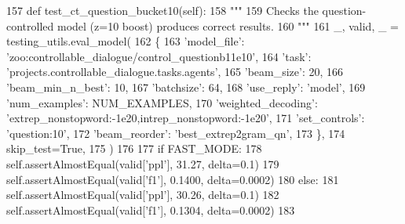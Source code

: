\begin{DoxyCode}
157     \textcolor{keyword}{def }test\_ct\_question\_bucket10(self):
158         \textcolor{stringliteral}{"""}
159 \textcolor{stringliteral}{        Checks the question-controlled model (z=10 boost) produces correct results.}
160 \textcolor{stringliteral}{        """}
161         \_, valid, \_ = testing\_utils.eval\_model(
162             \{
163                 \textcolor{stringliteral}{'model\_file'}: \textcolor{stringliteral}{'zoo:controllable\_dialogue/control\_questionb11e10'},
164                 \textcolor{stringliteral}{'task'}: \textcolor{stringliteral}{'projects.controllable\_dialogue.tasks.agents'},
165                 \textcolor{stringliteral}{'beam\_size'}: 20,
166                 \textcolor{stringliteral}{'beam\_min\_n\_best'}: 10,
167                 \textcolor{stringliteral}{'batchsize'}: 64,
168                 \textcolor{stringliteral}{'use\_reply'}: \textcolor{stringliteral}{'model'},
169                 \textcolor{stringliteral}{'num\_examples'}: NUM\_EXAMPLES,
170                 \textcolor{stringliteral}{'weighted\_decoding'}: \textcolor{stringliteral}{'extrep\_nonstopword:-1e20,intrep\_nonstopword:-1e20'},
171                 \textcolor{stringliteral}{'set\_controls'}: \textcolor{stringliteral}{'question:10'},
172                 \textcolor{stringliteral}{'beam\_reorder'}: \textcolor{stringliteral}{'best\_extrep2gram\_qn'},
173             \},
174             skip\_test=\textcolor{keyword}{True},
175         )
176 
177         \textcolor{keywordflow}{if} FAST\_MODE:
178             self.assertAlmostEqual(valid[\textcolor{stringliteral}{'ppl'}], 31.27, delta=0.1)
179             self.assertAlmostEqual(valid[\textcolor{stringliteral}{'f1'}], 0.1400, delta=0.0002)
180         \textcolor{keywordflow}{else}:
181             self.assertAlmostEqual(valid[\textcolor{stringliteral}{'ppl'}], 30.26, delta=0.1)
182             self.assertAlmostEqual(valid[\textcolor{stringliteral}{'f1'}], 0.1304, delta=0.0002)
183 
\end{DoxyCode}
\mbox{\label{classtest__controllable_1_1TestControllableDialogue_aad1b8cd43766d6bfe04339c5ed7f3830}} 

